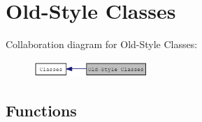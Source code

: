\hypertarget{group__class__old}{
\section{Old-\/Style Classes}
\label{group__class__old}
}


Collaboration diagram for Old-\/Style Classes:\nopagebreak
\begin{figure}[H]
\begin{center}
\leavevmode
\includegraphics[width=123pt]{group__class__old}
\end{center}
\end{figure}
\subsection*{Functions}
